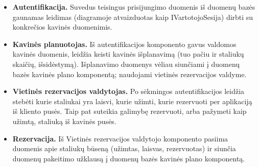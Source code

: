 \documentclass{VUMIFPSkursinis}
\begin{document}
\begin{itemize}
  \item \textbf{Autentifikacija.} Suvedus teisingus prisijungimo duomenis iš duomenų bazės gaunamas leidimas (diagramoje atvaizduotas kaip IVartotojoSesija) dirbti su konkrečios kavinės duomenimis.
  \item \textbf{Kavinės planuotojas.} Iš autentifikacijos komponento gavus valdomos kavinės duomenis, leidžia keisti kavinės išplanavimą (tuo pačiu ir staliukų skaičių, išsidėstymą). Išplanavimo duomenys vėliau siunčiami į duomenų bazės kavinės plano komponentą; naudojami vietinės rezervacijos valdyme.
  \item \textbf{Vietinės rezervacijos valdytojas.} Po sėkmingos autentifikacijos leidžia stebėti kurie staliukai yra laisvi, kurie užimti, kurie rezervuoti per aplikaciją iš kliento pusės. Taip pat suteikia galimybę rezervuoti, arba pažymeti kaip užimtą, staliuką iš kavinės pusės.
  \item \textbf{Rezervacija.} Iš Vietinės rezervacijos valdytojo komponento pasiima duomenis apie staliukų būseną (užimtas, laisvas, rezervuotas) ir siunčia duomenų pakeitimo užklausą į duomenų bazės kavinės plano komponentą.
\end{itemize}
\end{document}
